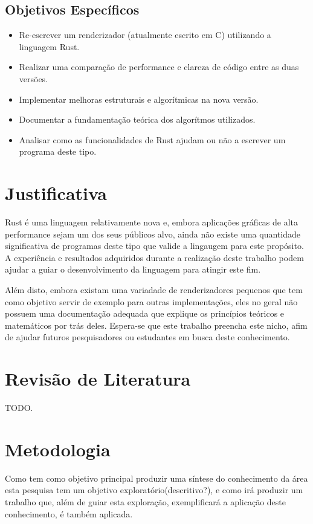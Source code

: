\documentclass[12pt]{article}
\def\Cpp{{C\nolinebreak[4]\raisebox{.20ex}{\small\bf++}}}
\newcommand{\todo}[1]{\textsf{\color{red}#1}}
\begin{document}
\subsection{Objetivos Específicos}
\begin{itemize}
	\item Re-escrever um renderizador (atualmente escrito em \Cpp) utilizando a linguagem Rust.
	\item Realizar uma comparação de performance e clareza de código entre as duas versões.
	\item Implementar melhoras estruturais e algorítmicas na nova versão.
	\item Documentar a fundamentação teórica dos algorítmos utilizados.
	\item Analisar como as funcionalidades de Rust ajudam ou não a escrever um programa deste tipo.
\end{itemize}

\section{Justificativa}

Rust é uma linguagem relativamente nova e, embora aplicações gráficas de alta performance sejam um dos seus públicos alvo, ainda não existe uma quantidade significativa de programas deste tipo que valide a lingaugem para este propósito. A experiência e resultados adquiridos durante a realização deste trabalho podem ajudar a guiar o desenvolvimento da linguagem para atingir este fim.

Além disto, embora existam uma variadade de renderizadores pequenos que tem como objetivo servir de exemplo para outras implementações, eles no geral não possuem uma documentação adequada que explique os princípios teóricos e matemáticos por trás deles. Espera-se que este trabalho preencha este nicho, afim de ajudar futuros pesquisadores ou estudantes em busca deste conhecimento.

\section{Revisão de Literatura}

\todo{TODO.}

\section{Metodologia}

Como tem como objetivo principal produzir uma síntese do conhecimento da área esta pesquisa tem um objetivo exploratório\todo{(descritivo?)}, e como irá produzir um trabalho que, além de guiar esta exploração, exemplificará a aplicação deste conhecimento, é também aplicada.
\end{document}
